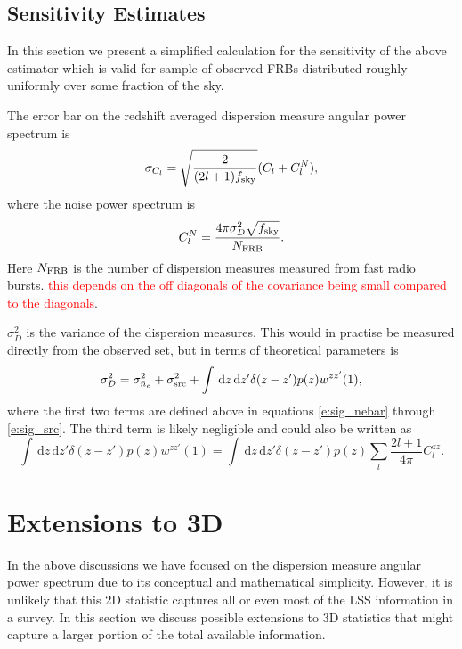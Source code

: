 \documentclass[onecolumn,prd,noshowpacs,nofootinbib,amsmath,amssymb]{revtex4}
\newcommand{\ud}{\,\mathrm{d}}
\newcommand{\red}{\textcolor{red}}
\begin{document}
\subsection{Sensitivity Estimates}

In this section we present a simplified calculation for the sensitivity of the
above estimator which is valid for sample of observed
FRBs distributed roughly uniformly over some fraction of the sky.

The error bar on the redshift averaged dispersion measure angular power spectrum
is
\begin{equation}
    \sigma_{C_l} = \sqrt{\frac{2}{(2 l + 1) f_{\rm sky}}} (C_l + C^N_l),
\end{equation}
where the noise power spectrum is
\begin{equation}
    C^N_l = \frac{4 \pi \sigma_D^2 \sqrt{f_{\rm sky}}}{N_{\rm FRB}}.
\end{equation}
Here $N_{\rm FRB}$ is the number of dispersion measures measured from fast
radio bursts. \red{this depends on the off diagonals of the covariance being
small compared to the diagonals}.

$\sigma_D^2$ is the variance of the dispersion measures.  This would in
practise be measured directly from the observed set, but in terms of
theoretical parameters is
\begin{equation}
\sigma_D^2 = \sigma_{\bar{n}_e}^2 + \sigma^2_{\rm src} + \int \ud z \ud z'
\delta(z - z') p(z) w^{z z'}(1),
\end{equation}
where the first two terms are defined above in equations \ref{e:sig_nebar}
through
\ref{e:sig_src}. The third term is likely
negligible and could also be written as
\begin{equation}
    \int \ud z \ud z' \delta(z - z') p(z) w^{z z'}(1) = \int \ud z \ud z'
    \delta(z - z') p(z) \sum_{l} \frac{2l+1}{4\pi} C_l^{zz}.
\end{equation}



\section{Extensions to 3D}

In the above discussions we have focused on the dispersion measure angular
power spectrum due to its conceptual and mathematical simplicity.
However, it is unlikely that this 2D statistic captures all or even most of the
LSS information in a survey.  In this section we discuss possible extensions to
3D statistics that might capture a larger portion of the total available
information.
\end{document}
